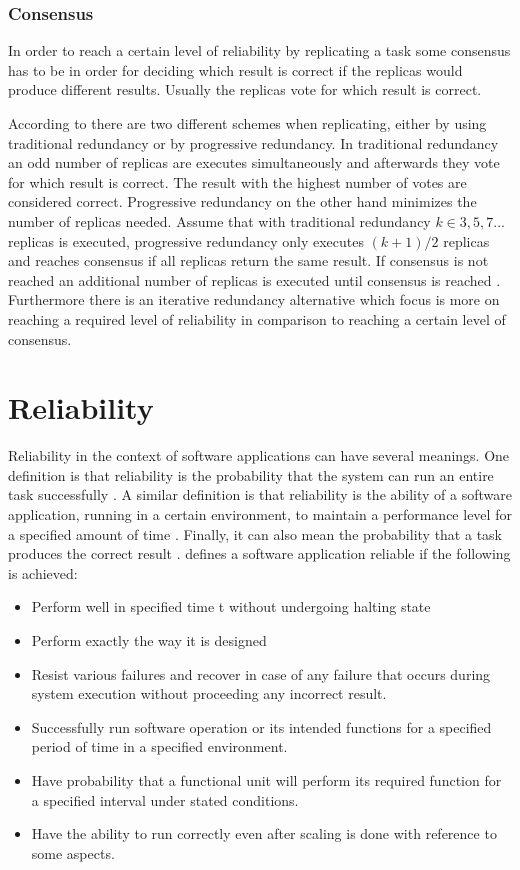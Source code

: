 \documentclass{cslthse-msc}
\begin{document}
\subsubsection*{Consensus}
In order to reach a certain level of reliability by replicating a task some consensus has to be in order for deciding which result is correct if the replicas would produce different results. Usually the replicas vote for which result is correct. %

According to \cite{selfAdaptRel} there are two different schemes when replicating, either by using traditional redundancy or by progressive redundancy. In traditional redundancy an odd number of replicas are executes simultaneously and afterwards they vote for which result is correct. The result with the highest number of votes are considered correct. Progressive redundancy on the other hand minimizes the number of replicas needed. Assume that with traditional redundancy $k \in {3,5,7...}$ replicas is executed, progressive redundancy only executes $(k+1)/2$ replicas and reaches consensus if all replicas return the same result. If consensus is not reached an additional number of replicas is executed until consensus is reached \cite{selfAdaptRel}. Furthermore there is an iterative redundancy alternative which focus is more on reaching a required level of reliability in comparison to reaching a certain level of consensus.

\section{Reliability} \label{sec:theory_reliability}
Reliability in the context of software applications can have several meanings. One definition is that reliability is the probability that the system can run an entire task successfully \cite{taskAllocation}. A similar definition is that reliability is the ability of a software application, running in a certain environment, to maintain a performance level for a specified amount of time \cite{X}. Finally, it can also mean the probability that a task produces the correct result \cite{X}. \cite{surveyReliabilityDistr} defines a software application reliable if the following is achieved:
\begin{itemize}
\item Perform well in specified time t without undergoing halting state
\item Perform exactly the way it is designed
\item Resist various failures and recover in case of any failure that occurs during system execution without proceeding any incorrect result.
\item Successfully run software operation or its intended functions for a specified period of time in a specified environment.
\item Have probability that a functional unit will perform its required function for a specified interval under stated conditions.
\item Have the ability to run correctly even after scaling is done with reference to some aspects.
\end{itemize}
\end{document}
